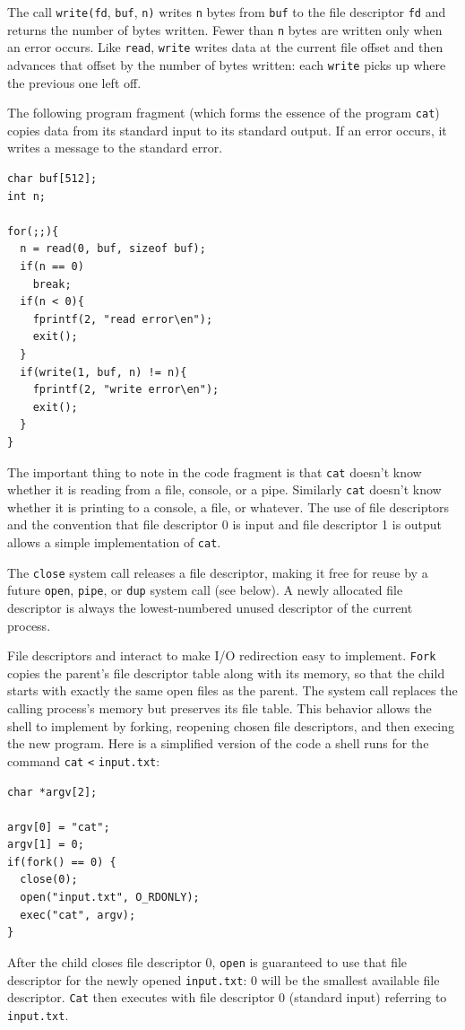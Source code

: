 The call
\lstinline{write(fd},
\lstinline{buf},
\lstinline{n)}
writes
\lstinline{n}
bytes from
\lstinline{buf}
to the file descriptor
\lstinline{fd}
and returns the number of bytes written.
Fewer than
\lstinline{n}
bytes are written only when an error occurs.
Like
\lstinline{read},
\lstinline{write}
writes data at the current file offset and then advances
that offset by the number of bytes written:
each
\lstinline{write}
picks up where the previous one left off.

The following program fragment (which forms the essence of the program
\lstinline{cat})
copies data from its standard input
to its standard output.  If an error occurs, it writes a message
to the standard error.
\begin{lstlisting}[]
char buf[512];
int n;

for(;;){
  n = read(0, buf, sizeof buf);
  if(n == 0)
    break;
  if(n < 0){
    fprintf(2, "read error\en");
    exit();
  }
  if(write(1, buf, n) != n){
    fprintf(2, "write error\en");
    exit();
  }
}
\end{lstlisting}
The important thing to note in the code fragment is that
\lstinline{cat}
doesn't know whether it is reading from a file, console, or a pipe.
Similarly 
\lstinline{cat}
doesn't know whether it is printing to a console, a file, or whatever.
The use of file descriptors and the convention that file descriptor 0
is input and file descriptor 1 is output allows a simple
implementation
of 
\lstinline{cat}.

The
\lstinline{close}
system call
releases a file descriptor, making it free for reuse by a future
\lstinline{open},
\lstinline{pipe},
or
\lstinline{dup}
system call (see below).
A newly allocated file descriptor 
is always the lowest-numbered unused
descriptor of the current process.

File descriptors and
interact to make I/O redirection easy to implement.
\lstinline{Fork}
copies the parent's file descriptor table along with its memory,
so that the child starts with exactly the same open files as the parent.
The system call
replaces the calling process's memory but preserves its file table.
This behavior allows the shell to
implement  by forking, reopening chosen file descriptors,
and then execing the new program.
Here is a simplified version of the code a shell runs for the
command
\lstinline{cat}
\lstinline{<}
\lstinline{input.txt}:
\begin{lstlisting}[]
char *argv[2];

argv[0] = "cat";
argv[1] = 0;
if(fork() == 0) {
  close(0);
  open("input.txt", O_RDONLY);
  exec("cat", argv);
}
\end{lstlisting}
After the child closes file descriptor 0,
\lstinline{open}
is guaranteed to use that file descriptor
for the newly opened
\lstinline{input.txt}:
0 will be the smallest available file descriptor.
\lstinline{Cat}
then executes with file descriptor 0 (standard input) referring to
\lstinline{input.txt}.


